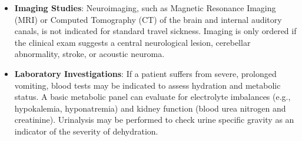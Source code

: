 \begin{itemize}
\begin{itemize}
    \end{itemize}
    \item \textbf{Imaging Studies}: Neuroimaging, such as Magnetic Resonance Imaging (MRI) or Computed Tomography (CT) of the brain and internal auditory canals, is not indicated for standard travel sickness. Imaging is only ordered if the clinical exam suggests a central neurological lesion, cerebellar abnormality, stroke, or acoustic neuroma.
    \item \textbf{Laboratory Investigations}: If a patient suffers from severe, prolonged vomiting, blood tests may be indicated to assess hydration and metabolic status. A basic metabolic panel can evaluate for electrolyte imbalances (e.g., hypokalemia, hyponatremia) and kidney function (blood urea nitrogen and creatinine). Urinalysis may be performed to check urine specific gravity as an indicator of the severity of dehydration.
\end{itemize}

